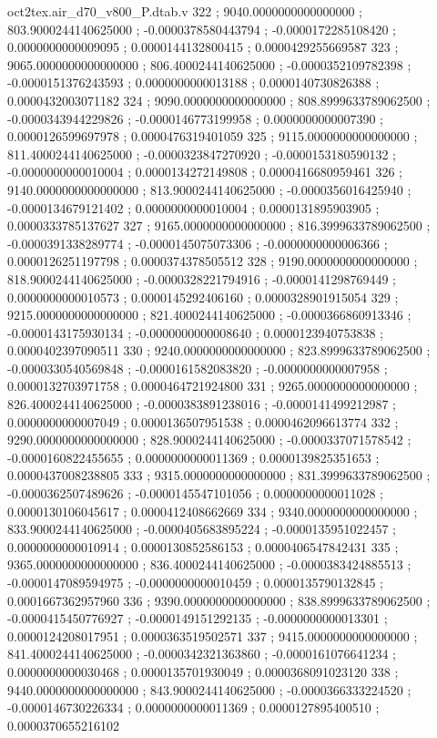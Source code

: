 \begin{filecontents}[overwrite]{oct2tex.air_d70_v800_P.dtab.v}
322 ; 9040.0000000000000000 ; 803.9000244140625000 ; -0.0000378580443794 ; -0.0000172285108420 ; 0.0000000000009095 ; 0.0000144132800415 ; 0.0000429255669587
323 ; 9065.0000000000000000 ; 806.4000244140625000 ; -0.0000352109782398 ; -0.0000151376243593 ; 0.0000000000013188 ; 0.0000140730826388 ; 0.0000432003071182
324 ; 9090.0000000000000000 ; 808.8999633789062500 ; -0.0000343944229826 ; -0.0000146773199958 ; 0.0000000000007390 ; 0.0000126599697978 ; 0.0000476319401059
325 ; 9115.0000000000000000 ; 811.4000244140625000 ; -0.0000323847270920 ; -0.0000153180590132 ; -0.0000000000010004 ; 0.0000134272149808 ; 0.0000416680959461
326 ; 9140.0000000000000000 ; 813.9000244140625000 ; -0.0000356016425940 ; -0.0000134679121402 ; 0.0000000000010004 ; 0.0000131895903905 ; 0.0000333785137627
327 ; 9165.0000000000000000 ; 816.3999633789062500 ; -0.0000391338289774 ; -0.0000145075073306 ; -0.0000000000006366 ; 0.0000126251197798 ; 0.0000374378505512
328 ; 9190.0000000000000000 ; 818.9000244140625000 ; -0.0000328221794916 ; -0.0000141298769449 ; 0.0000000000010573 ; 0.0000145292406160 ; 0.0000328901915054
329 ; 9215.0000000000000000 ; 821.4000244140625000 ; -0.0000366860913346 ; -0.0000143175930134 ; -0.0000000000008640 ; 0.0000123940753838 ; 0.0000402397090511
330 ; 9240.0000000000000000 ; 823.8999633789062500 ; -0.0000330540569848 ; -0.0000161582083820 ; -0.0000000000007958 ; 0.0000132703971758 ; 0.0000464721924800
331 ; 9265.0000000000000000 ; 826.4000244140625000 ; -0.0000383891238016 ; -0.0000141499212987 ; 0.0000000000007049 ; 0.0000136507951538 ; 0.0000462096613774
332 ; 9290.0000000000000000 ; 828.9000244140625000 ; -0.0000337071578542 ; -0.0000160822455655 ; 0.0000000000011369 ; 0.0000139825351653 ; 0.0000437008238805
333 ; 9315.0000000000000000 ; 831.3999633789062500 ; -0.0000362507489626 ; -0.0000145547101056 ; 0.0000000000011028 ; 0.0000130106045617 ; 0.0000412408662669
334 ; 9340.0000000000000000 ; 833.9000244140625000 ; -0.0000405683895224 ; -0.0000135951022457 ; 0.0000000000010914 ; 0.0000130852586153 ; 0.0000406547842431
335 ; 9365.0000000000000000 ; 836.4000244140625000 ; -0.0000383424885513 ; -0.0000147089594975 ; -0.0000000000010459 ; 0.0000135790132845 ; 0.0001667362957960
336 ; 9390.0000000000000000 ; 838.8999633789062500 ; -0.0000415450776927 ; -0.0000149151292135 ; -0.0000000000013301 ; 0.0000124208017951 ; 0.0000363519502571
337 ; 9415.0000000000000000 ; 841.4000244140625000 ; -0.0000342321363860 ; -0.0000161076641234 ; 0.0000000000030468 ; 0.0000135701930049 ; 0.0000368091023120
338 ; 9440.0000000000000000 ; 843.9000244140625000 ; -0.0000366333224520 ; -0.0000146730226334 ; 0.0000000000011369 ; 0.0000127895400510 ; 0.0000370655216102

\end{filecontents}
